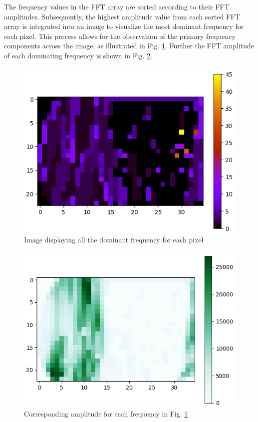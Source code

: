 \documentclass[conference]{IEEEtran}
\begin{document}
The frequency values in the FFT array are sorted according to their FFT amplitudes. Subsequently, the highest amplitude value from each sorted FFT array is integrated into an image to visualize the most dominant frequency for each pixel. This process allows for the observation of the primary frequency components across the image, as illustrated in Fig. \ref{fig:k5}. Further the FFT amplitude of each dominating frequency is shown in Fig. \ref{fig:k6}.

		\begin{figure}[H]
	\includegraphics[scale=.51]{plot/freq.png}
	\caption{Image displaying all the dominant frequency for each pixel}\label{fig:k5}
\end{figure}

		\begin{figure}[H]
	\includegraphics[scale=.51]{plot/ampli.png}
	\caption{Corresponding amplitude for each frequency in Fig. \ref{fig:k5}}\label{fig:k6}
\end{figure}
\end{document}
